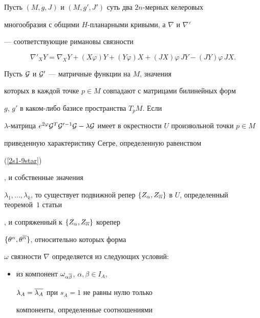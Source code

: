 \begin{thm}\label{2s2-th2}


Пусть $(M,g,J)$ и $(M,g',J')$ суть два $2n$-мерных келеровых


многообразия с общими $H$-планарными кривыми, а $\nabla$ и $\nabla'$


--- соответствующие римановы связности


\begin{equation}\label{2s2-81}


\nabla'_X Y = \nabla_X Y +


(X\varphi)Y + (Y\varphi)X + (JX)\varphi \, JY - (JY)\varphi \, JX.


\end{equation}


Пусть ${\cal G}$ и ${\cal G'}$ --- матричные функции на $M$, значения


которых в каждой точке $p \in M$ совпадают с матрицами билинейных форм


$g$, $g'$ в каком-либо базисе пространства $T_p M$. Если


$\lambda$-матрица $e^{2\vi}{\cal G}^T {\cal G}'{}^{-1}{\cal G} - \lambda


{\cal G}$ имеет в окрестности $U$ произвольной точки $p \in M$


приведенную характеристику Сегре, определенную равенством {\rom


{(\ref{2s1-9star})}}, и собственные значения


$\lambda_1,\dotsc,\lambda_k$, то существует подвижной репер $\{


Z_\alpha, Z_{\ol\alpha} \}$ в $U$, определенный теоремой~$1$ статьи




\cite{kanew}, и сопряженный к $\{ Z_\alpha, Z_{\overline\alpha} \}$ корепер


$\{\theta^\alpha, \theta^{\overline\alpha} \}$, относительно которых форма


$\omega$ связности $\nabla$ определяется из следующих условий$:$


\begin{itemize}


\item[1)]


из компонент $\omega_{\alpha\overline\beta}$, $\alpha,\beta \in I_A$,


$\lambda_A = \overline{\lambda_A}$ при $s_A=1$ не равны нулю только


компоненты, определенные соотношениями



\end{itemize}
\end{thm}
